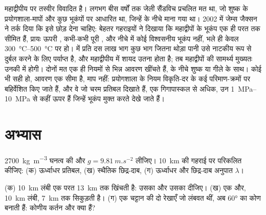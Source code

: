 महाद्वीपीय  पर तस्वीर विवादित है। लगभग बीस वर्षों तक जेली सैंडविच प्रचलित मत था, जो शुष्क  के प्रयोगशाला-मापों और कुछ भूकंपों पर आधारित था, जिन्हें  के नीचे माना गया था। 2002 में जेम्स जैक्सन ने तर्क दिया कि इसे छोड़ देना चाहिए: बेहतर गहराइयों ने दिखाया कि महाद्वीपों के भूकंप एक ही परत तक सीमित हैं, प्रायः ऊपरी , कभी-कभी पूरी , और नीचे  में कोई विश्वसनीय भूकंप नहीं, भले ही  केवल \qtyrange{300}{500}{\degreeCelsius} पर हो।  में प्रति दस लाख भाग कुछ भाग जितना थोड़ा पानी उसे नाटकीय रूप से दुर्बल करने के लिए पर्याप्त है, और महाद्वीपीय  में शायद उतना होता है; तब महाद्वीपों की सामर्थ्य मुख्यतः उनकी  में होगी। दोनों मत एक ही नियमों से भिन्न आवरण खींचते हैं,  के नीचे शुष्क या गीले  के साथ।
कोई भी सही हो, आवरण एक सीमा है, माप नहीं: प्रयोगशाला के नियम विकृति-दर के कई परिमाण-क्रमों पर बहिर्वेशित किए जाते हैं, और वे जो चरम प्रतिबल दिखाते हैं, एक गिगापास्कल से अधिक, उन \qtyrange{1}{10}{MPa} से कहीं ऊपर हैं जिन्हें भूकंप मुक्त करते देखे जाते हैं।

\section{अभ्यास}

\begin{exercise}[$\star$]\label{exo:b1:stress-strain-rheology:1}
\qty{2700}{kg.m^{-3}} घनत्व की  और $g = \qty{9.81}{m.s^{-2}}$ लीजिए। \qty{10}{km} की गहराई पर परिकलित कीजिए: (क) ऊर्ध्वाधर प्रतिबल, (ख) स्थैतिक छिद्र-दाब, (ग) ऊर्ध्वाधर  और छिद्र-दाब अनुपात $\lambda$।
\end{exercise}

\begin{exercise}[$\star$]\label{exo:b1:stress-strain-rheology:2}
(क) \qty{10}{km} लंबी एक परत \qty{13}{km} तक खिंचती है: उसका  और उसका  दीजिए। (ख) एक और, \qty{10}{km} लंबी, \qty{7}{km} तक सिकुड़ती है। (ग) एक चट्टान की दो रेखाएँ जो लंबवत थीं, अब \ang{60} का कोण बनाती हैं: कोणीय कर्तन और  क्या हैं?
\end{exercise}

